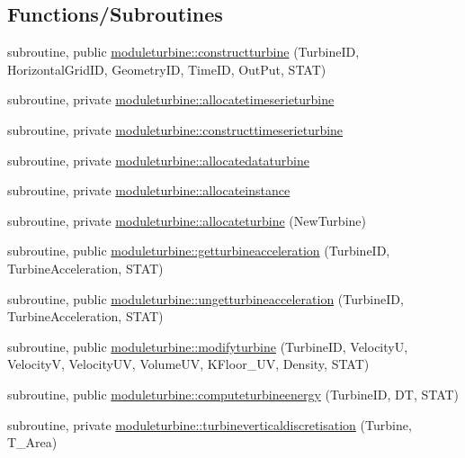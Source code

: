 \subsection*{Functions/\+Subroutines}
\begin{DoxyCompactItemize}
\item 
subroutine, public \mbox{\hyperlink{namespacemoduleturbine_aa2c0679550365b9b4e3258a1d4a155cf}{moduleturbine\+::constructturbine}} (Turbine\+ID, Horizontal\+Grid\+ID, Geometry\+ID, Time\+ID, Out\+Put, S\+T\+AT)
\item 
subroutine, private \mbox{\hyperlink{namespacemoduleturbine_aed8d3d353e62537ef1a5c8225de8339a}{moduleturbine\+::allocatetimeserieturbine}}
\item 
subroutine, private \mbox{\hyperlink{namespacemoduleturbine_a9771605ad11401e5f01589b0db35b8f2}{moduleturbine\+::constructtimeserieturbine}}
\item 
subroutine, private \mbox{\hyperlink{namespacemoduleturbine_a7059f998720fdb2216b49dcc732d5d14}{moduleturbine\+::allocatedataturbine}}
\item 
subroutine, private \mbox{\hyperlink{namespacemoduleturbine_ae9c4617b28df25e1f4b06eb1ae1051e4}{moduleturbine\+::allocateinstance}}
\item 
subroutine, private \mbox{\hyperlink{namespacemoduleturbine_a256dbbfda7b4fd109ab1088e055e3bd0}{moduleturbine\+::allocateturbine}} (New\+Turbine)
\item 
subroutine, public \mbox{\hyperlink{namespacemoduleturbine_a5ce2cf1858c4b390f22dc2451c692f3c}{moduleturbine\+::getturbineacceleration}} (Turbine\+ID, Turbine\+Acceleration, S\+T\+AT)
\item 
subroutine, public \mbox{\hyperlink{namespacemoduleturbine_ac345708176716a36f768cfd878d6a6b0}{moduleturbine\+::ungetturbineacceleration}} (Turbine\+ID, Turbine\+Acceleration, S\+T\+AT)
\item 
subroutine, public \mbox{\hyperlink{namespacemoduleturbine_a91250e475b9a5222abdd834b760515c6}{moduleturbine\+::modifyturbine}} (Turbine\+ID, VelocityU, VelocityV, Velocity\+UV, Volume\+UV, K\+Floor\+\_\+\+UV, Density, S\+T\+AT)
\item 
subroutine, public \mbox{\hyperlink{namespacemoduleturbine_a35c07aae7c495f5bff14bf45e5811a6e}{moduleturbine\+::computeturbineenergy}} (Turbine\+ID, DT, S\+T\+AT)
\item 
subroutine, private \mbox{\hyperlink{namespacemoduleturbine_a796f4418d909ff969c2d9169148e3414}{moduleturbine\+::turbineverticaldiscretisation}} (Turbine, T\+\_\+\+Area)

\end{DoxyCompactItemize}
